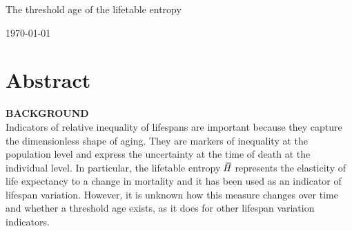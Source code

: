 \documentclass[a4paper,twoside, openright, 12pt, leqno]{article}
\newcommand*\xbar[1]{%
   \hbox{%
     \vbox{%
       \hrule height 0.5pt %
       \kern0.3ex%
       \hbox{%
         \kern-0.28em%
         \ensuremath{#1}%
         \kern-0.05em%
       }%
     }%
   }%
}
\newcommand\fnsep{\textsuperscript{,}}
\begin{document}
\renewcommand{\thefootnote}{\alph{footnote}}

\thispagestyle{empty}

\begin{center}
    
    \vspace*{1cm}
    \LARGE{The threshold age of the lifetable entropy}	
    \vspace{.4cm}    
        
           
    \vspace{1cm}
    
    \vspace{1cm}
    \large\today
    \vspace{1cm}
       
\end{center}

\renewcommand{\thefootnote}{\arabic{footnote}}
\setcounter{footnote}{0}

\section*{Abstract}
\bigskip

\textbf{BACKGROUND} \\
Indicators of relative inequality of lifespans are important because they capture the dimensionless shape of aging. They are markers of inequality at the population level and express the uncertainty at the time of death at the individual level. In particular, the lifetable entropy $\,\xbar{H}$ represents the elasticity of life expectancy to a change in mortality and it has been used as an indicator of lifespan variation. However, it is unknown how this measure changes over time and whether a threshold age exists, as it does for other lifespan variation indicators.
\bigskip
\end{document}
